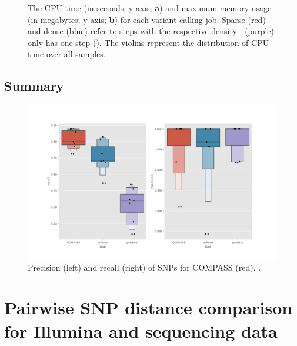 \begin{figure}
\begin{subfigure}[b]{0.475\textwidth}
         \caption{}
         \label{fig:max-mem}
     \end{subfigure}
        \caption{The CPU time (in seconds; y-axis; \textbf{a}) and maximum memory usage (in megabytes; y-axis; \textbf{b}) for each \ont{} variant-calling job. Sparse (red) and dense (blue) refer to \pandora{} steps with the respective density \prg{}.  (purple) only has one step (). The violins represent the distribution of CPU time over all samples. }
        \label{fig:var-comp-perf}
\end{figure}

\subsection{Summary}


\begin{figure}
\begin{center}
\includegraphics[width=0.9\columnwidth]{Chapter2/Figs/combined-precision-recall-filters-snps.png}
\caption{{Precision (left) and recall (right) of SNPs for COMPASS (red), . 
{\label{fig:prec-recall-filters}}%
}}
\end{center}
\end{figure}


\section{Pairwise SNP distance comparison for Illumina and \ont{} sequencing data}

